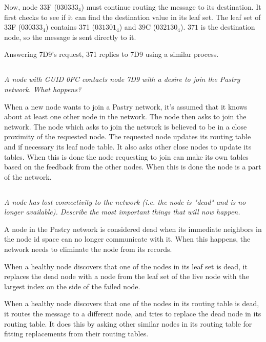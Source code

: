 \documentclass{article}
\newcommand{\question}[1]{\subsection{}\textit{#1}\bigskip}
\begin{document}
Now, node 33F ($ 030333_4 $) must continue routing the message to its destination.
It first checks to see if it can find the destination value in its leaf set.
The leaf set of 33F ($ 030333_4 $) contains 371 ($ 031301_4 $) and 39C ($ 032130_4 $).
$ 371 $ is the destination node, so the message is sent directly to it.

Answering 7D9's request, 371 replies to 7D9 using a similar process.


\question{A node with GUID 0FC contacts node 7D9 with a desire to join the Pastry network. What happens?}

When a new node wants to join a Pastry network, it's assumed that it knows about at least one other node in the network. The node then asks to join the network.
The node which asks to join the network is believed to be in a close proximity of the requested node.
The requested node updates its routing table and if necessary its leaf node table. It also asks other close nodes to update its tables.
When this is done the node requesting to join can make its own tables based on the feedback from the other nodes.
When this is done the node is a part of the network.

\question{A node has lost connectivity to the network (i.e. the node is "dead" and is no longer available). Describe the most important things that will now happen.}

A node in the Pastry network is considered dead when its immediate neighbors in the node id space can no longer communicate with it.
When this happens, the network needs to eliminate the node from its records.

When a healthy node discovers that one of the nodes in its leaf set is dead, it replaces the dead node with a node from the leaf set of the live node with the largest index on the side of the failed node.

When a healthy node discovers that one of the nodes in its routing table is dead, it routes the message to a different node, and tries to replace the dead node in its routing table.
It does this by asking other similar nodes in its routing table for fitting replacements from their routing tables.
\end{document}
